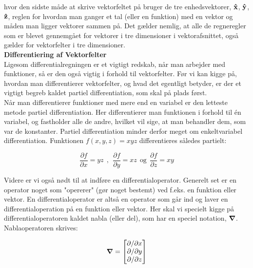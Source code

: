 \vspace{2mm}

hvor den sidste måde at skrive vektorfeltet på bruger de tre enhedsvektorer, $\mathbf{\hat{x}}$, $\mathbf{\hat{y}}$, $\mathbf{\hat{z}}$, reglen for hvordan man ganger et tal (eller en funktion) med en vektor  og måden man ligger vektorer sammen på. Det gælder nemlig, at alle de regneregler som er blevet gennemgået for vektorer i tre dimensioner i vektorafsnittet, også gælder for vektorfelter i tre dimensioner.\\

\noindent
\textbf{Differentiering af Vektorfelter}\\

Ligesom differentialregningen er et vigtigt redskab, når man arbejder med funktioner, så er den også vigtig i forhold til vektorfelter. Før vi kan kigge på, hvordan man differentierer vektorfelter, og hvad det egentligt betyder, er der et vigtigt begreb kaldet partiel differentiation, som skal på plads først.\\

Når man differentierer funktioner med mere end en variabel er den letteste metode partiel differentiation. Her differentierer man funktionen i forhold til én variabel, og fastholder alle de andre, hvilket vil sige, at man behandler dem, som var de konstanter. Partiel differentiation minder derfor meget om enkeltvariabel differentiation. Funktionen $f(x,y,z)=xyz$ differentieres således partielt:

$$\frac{\partial f}{\partial x} = yz ~~,~~ \frac{\partial f}{\partial y} = xz ~~ \text{og} ~~  \frac{\partial f}{\partial z} = xy$$

\vspace{2mm}

Videre er vi også nødt til at indføre en differentialoperator. Generelt set er en operator noget som "opererer" (gør noget bestemt) ved f.eks. en funktion eller vektor. En differentialoperator er altså en operator som går ind og laver en differentialoperation på en funktion eller vektor. Her skal vi specielt kigge på differentialoperatoren kaldet nabla (eller del), som har en speciel notation, $\mbox{\boldmath$ \nabla $}$. Nablaoperatoren skrives:

\begin{equation}
\mbox{\boldmath$ \nabla $} = \begin{bmatrix} \partial / \partial x \\ \partial / \partial y \\ \partial / \partial z \end{bmatrix}
\end{equation}

\vspace{2mm}


